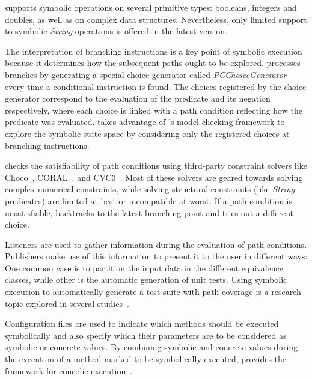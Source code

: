 \spf{} supports symbolic operations on several primitive types: booleans, integers and doubles, as well as on complex data structures. Nevertheless, only limited support to symbolic \textit{String} operations is offered in the latest \spf{} version.

The interpretation of branching instructions is a key point of symbolic execution because it determines how the subsequent paths ought to be explored. \spf{} processes branches by generating a special choice generator called \textit{PCChoiceGenerator} every time a conditional instruction is found. The choices registered by the choice generator correspond to the evaluation of the predicate and its negation respectively, where each choice is linked with a path condition reflecting how the predicate was evaluated. \spf{} takes advantage of \jpf{}'s model checking framework to explore the symbolic state space by considering only the registered choices at branching instructions.

\spf{} checks the satisfiability of path conditions using third-party constraint solvers like Choco~\cite{Choco2016}, CORAL~\cite{Souza}, and CVC3~\cite{Barrett2007}. Most of these solvers are geared towards solving complex numerical constraints, while solving structural constraints (like \textit{String} predicates) are limited at best or incompatible at worst. If a path condition is unsatisfiable, \spf{} backtracks to the latest branching point and tries out a different choice.

Listeners are used to gather information during the evaluation of path conditions. Publishers make use of this information to present it to the user in different ways: One common case is to partition the input data in the different equivalence classes, while other is the automatic generation of unit tests. Using symbolic execution to automatically generate a test suite with path coverage is a research topic explored in several studies~\cite{Pasareanu2008b,Visser2004a,Godefroid2008}.

Configuration files are used to indicate which methods should be executed symbolically and also specify which their parameters are to be considered as symbolic or concrete values. By combining symbolic and concrete values during the execution of a method marked to be symbolically executed, \spf{} provides the framework for concolic execution~\cite{Godefroid2005}.








